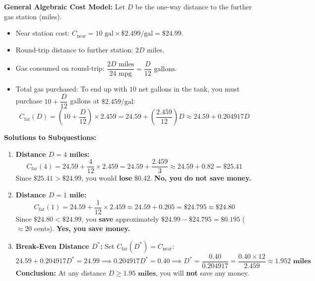 \documentclass[10.5pt]{article}
\begin{document}
\vspace{0.03in}
\textbf{General Algebraic Cost Model:}
Let $D$ be the one-way distance to the further gas station (miles).
\begin{itemize}[leftmargin=1.2em, topsep=1pt, itemsep=2pt]
  \item Near station cost: $C_{\text{near}} = 10 \text{ gal} \times \$2.499/\text{gal} = \mathbf{\$24.99}$.
  \item Round-trip distance to further station: $2D$ miles.
  \item Gas consumed on round-trip: $\dfrac{2D \text{ miles}}{24 \text{ mpg}} = \dfrac{D}{12} \text{ gallons}$.
  \item Total gas purchased: To end up with $10$ net gallons in the tank, you must purchase $10 + \dfrac{D}{12}$ gallons at $\$2.459/\text{gal}$:
  \[
  C_{\text{far}}(D) = \left(10 + \frac{D}{12}\right) \times 2.459 = 24.59 + \left(\frac{2.459}{12}\right) D \approx 24.59 + 0.204917 D
  \]
\end{itemize}

\textbf{Solutions to Subquestions:}
\begin{enumerate}[label=(\alph*), leftmargin=1.2em, topsep=1pt, itemsep=3pt]
  \item \textbf{Distance $D = 4$ miles:}
  \[
  C_{\text{far}}(4) = 24.59 + \frac{4}{12} \times 2.459 = 24.59 + \frac{2.459}{3} \approx 24.59 + 0.82 = \mathbf{\$25.41}
  \]
  Since $\$25.41 > \$24.99$, you would \textbf{lose} $\$0.42$. \textbf{No, you do not save money.}
  \item \textbf{Distance $D = 1$ mile:}
  \[
  C_{\text{far}}(1) = 24.59 + \frac{1}{12} \times 2.459 \approx 24.59 + 0.205 = \mathbf{\$24.795} \approx \mathbf{\$24.80}
  \]
  Since $\$24.80 < \$24.99$, you \textbf{save} approximately $\$24.99 - \$24.795 = \mathbf{\$0.195}$ ($\approx 20\text{ cents}$). \textbf{Yes, you save money.}
  \item \textbf{Break-Even Distance $D^*$:}
  Set $C_{\text{far}}(D^*) = C_{\text{near}}$:
  \[
  24.59 + 0.204917 D^* = 24.99 \implies 0.204917 D^* = 0.40 \implies D^* = \frac{0.40}{0.204917} = \frac{0.40 \times 12}{2.459} \approx \mathbf{1.952 \text{ miles}}
  \]
  \textbf{Conclusion:} At any distance $D \ge \mathbf{1.95 \text{ miles}}$, you will \textbf{not} save any money.
\end{enumerate}
\end{document}
